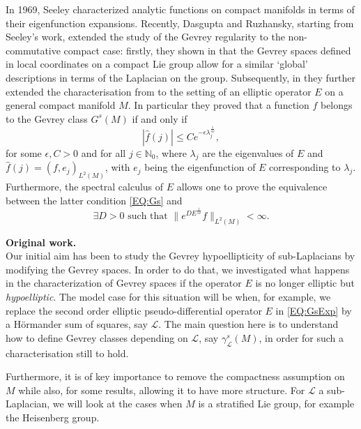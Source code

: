 \documentclass[12pt,oneside,a4paper]{book}
\numberwithin{equation}{section}     %
\theoremstyle{plain}
\theoremstyle{definition}
\newcommand{\N}{{\mathbb N}}
\newcommand{\slp}{{\mathcal L}}
\begin{document}
In 1969, Seeley \cite{S1969} characterized analytic functions on compact manifolds in terms of their eigenfunction expansions. Recently, Dasgupta and Ruzhansky, starting from Seeley's work, extended the study of the Gevrey regularity to the non-commutative  compact case: firstly, they shown in \cite{DR2014} that the Gevrey spaces defined in local coordinates on a compact Lie group allow for a similar `global' descriptions in terms of the Laplacian on the group. Subsequently, in \cite{DR2016} they further extended  the characterisation from \cite{DR2014} to the setting of an elliptic operator $E$ on a general compact manifold $M$. In particular they proved that a function $f$ belongs to the Gevrey class $G^s(M)$ if and only if 
\begin{equation}\label{EQ:Gs}
|\widehat{f}(j)|\leq C e^{-\epsilon \lambda_j^{\frac{1}{s\nu}}},
\end{equation}
for some $\epsilon, C>0$ and for all $j\in\N_0$, where $\lambda_j$ are the eigenvalues of $E$ and 
$\widehat{f}(j)=(f,e_j)_{L^2(M)}$, with $e_j$ being the eigenfunction of $E$ corresponding to $\lambda_j$. Furthermore, the spectral calculus of $E$ allows one to prove the equivalence between the latter condition \eqref{EQ:Gs} and
\begin{equation}\label{EQ:GsExp}
\exists D>0\textrm{ such that }
\| e^{D E^{\frac{1}{s\nu}}} f\|_{L^2(M)}<\infty. 
\end{equation}

\textbf{Original work.}\\
Our initial aim has been to study the Gevrey hypoellipticity of sub-Laplacians by modifying the Gevrey spaces.
In order to do that, we investigated what happens in the characterization of Gevrey spaces if the operator $E$ is no longer elliptic but \textit{hypoelliptic}. The model case for this situation will be when, for example, we replace the second order elliptic pseudo-differential operator $E$ in \eqref{EQ:GsExp} by a H\"ormander sum of squares, say $\slp$. The main question here is to understand how to define  Gevrey classes depending on $\slp$, say $\gamma^s_\slp(M)$, in order for such a characterisation still to hold.

Furthermore, it is of key importance to remove the compactness assumption on $M$ while also, for some results, allowing it to have more structure. For $\slp$ a sub-Laplacian, we will look at the cases when $M$ is a stratified Lie group, for example the Heisenberg group.
\end{document}
